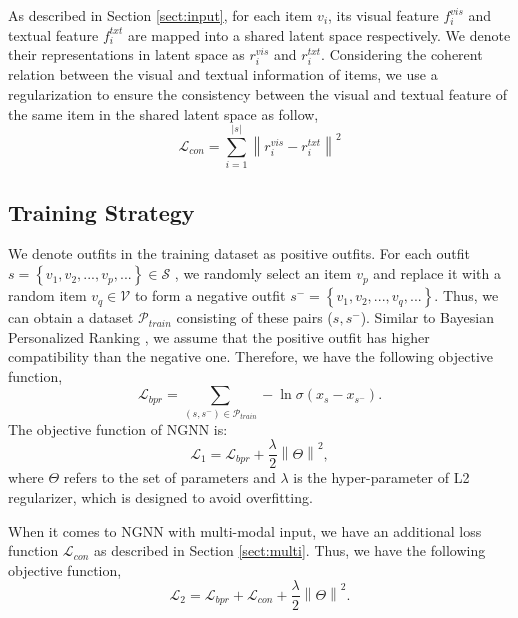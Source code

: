 \documentclass[sigconf]{acmart}
\begin{document}
As described in Section \ref{sect:input}, for each item $v_{i}$, its visual feature $f_{i}^{vis}$ and textual feature $f_{i}^{txt}$ are mapped into a shared latent space respectively. We denote their representations in latent space as $r_{i}^{vis}$ and $r_{i}^{txt}$. Considering the coherent relation between the visual and textual information of items, we use a regularization to ensure the consistency between the visual and textual feature of the same item in the shared latent space as follow,
\begin{equation} \label{consistency}
\mathcal{L}_{con} = \sum_{i=1}^{\left | s \right |} \left \| r_{i}^{vis} - r_{i}^{txt} \right \|^{2}
\end{equation}

\subsection{Training Strategy}


We denote outfits in the training dataset as positive outfits.
For each outfit $s = \left \{v_{1}, v_{2},...,v_{p},...\right \} \in \mathcal{S}$ , we randomly select an item $v_{p}$ and replace it with a random item $v_{q} \in \mathcal{V}$ to form a negative outfit $s^{-}=\left \{v_{1}, v_{2},...,v_{q},... \right \}$. Thus, we can obtain a dataset $\mathcal{P}_{train}$ consisting of these pairs ($s, s^{-}$).
Similar to Bayesian Personalized Ranking \cite{rendle2009bpr}, we assume that the positive outfit has higher compatibility than the negative one. Therefore, we have the following objective function,
\begin{equation} \label{bpr_func}
\mathcal{L}_{bpr} = \sum_{(s,s^{-}) \in \mathcal{P}_{train}} -\ln \sigma(x_{s} - x_{s^{-}}).
\end{equation}
The objective function of NGNN is:
\begin{equation} \label{obj_func}
\mathcal{L}_{1} = \mathcal{L}_{bpr} + \frac{\lambda}{2}\left \| \Theta \right \|^{2},
\end{equation}
where $\Theta$ refers to the set of parameters and
$\lambda$ is the hyper-parameter of L2 regularizer, which is designed to avoid overfitting.


When it comes to NGNN with multi-modal input, we have an additional loss function $\mathcal{L}_{con}$ as described in Section \ref{sect:multi}. Thus, we have the following objective function,
\begin{equation} \label{obj_func}
\mathcal{L}_{2} = \mathcal{L}_{bpr} + \mathcal{L}_{con} + \frac{\lambda}{2}\left \| \Theta \right \|^{2}.
\end{equation}
\end{document}
